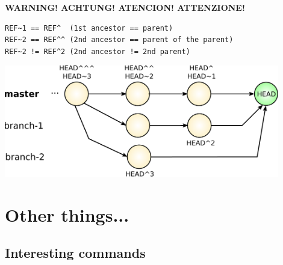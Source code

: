 \begin{frame}[fragile]
  \frametitle{\insertsubsection}

\textbf{WARNING! ACHTUNG! ATENCION! ATTENZIONE!}
\begin{verbatim}
REF~1 == REF^  (1st ancestor == parent)
REF~2 == REF^^ (2nd ancestor == parent of the parent)
REF~2 != REF^2 (2nd ancestor != 2nd parent)
\end{verbatim}

\begin{center}
  \includegraphics[width=0.9\textwidth]{images/pdf/git-references.pdf}
\end{center}

\end{frame}


\section{Other things...}

\subsection{Interesting commands}


